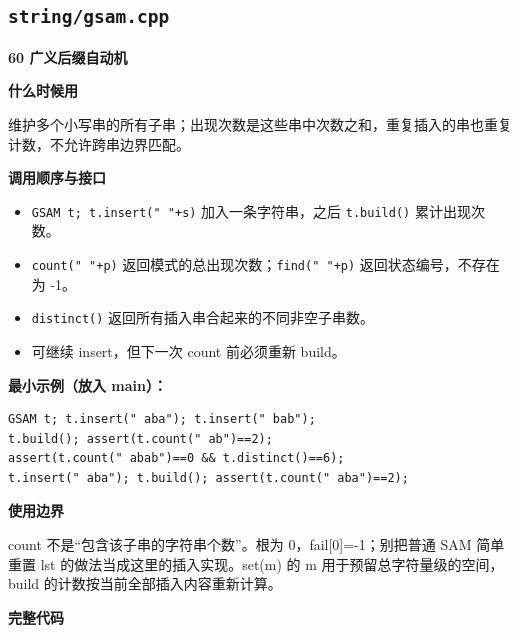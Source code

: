 \documentclass[UTF8,a4paper,10pt]{ctexart}
\newcommand{\TemplUsage}[1]{\textbf{什么时候用}\par #1\par}
\newcommand{\TemplApi}[1]{\textbf{调用顺序与接口}\par #1\par}
\newcommand{\TemplNote}[1]{\textbf{使用边界}\par #1\par}
\begin{document}
\subsection{\texttt{string/gsam.cpp}}
\textbf{60 广义后缀自动机}

\TemplUsage{维护多个小写串的所有子串；出现次数是这些串中次数之和，重复插入的串也重复计数，不允许跨串边界匹配。}
\TemplApi{\begin{itemize}
\item \texttt{GSAM t; t.insert(" "+s)} 加入一条字符串，之后 \texttt{t.build()} 累计出现次数。
\item \texttt{count(" "+p)} 返回模式的总出现次数；\texttt{find(" "+p)} 返回状态编号，不存在为 -1。
\item \texttt{distinct()} 返回所有插入串合起来的不同非空子串数。
\item 可继续 insert，但下一次 count 前必须重新 build。
\end{itemize}}
\textbf{最小示例（放入 main）：}
\begin{lstlisting}
GSAM t; t.insert(" aba"); t.insert(" bab");
t.build(); assert(t.count(" ab")==2);
assert(t.count(" abab")==0 && t.distinct()==6);
t.insert(" aba"); t.build(); assert(t.count(" aba")==2);
\end{lstlisting}
\TemplNote{count 不是“包含该子串的字符串个数”。根为 0，fail[0]=-1；别把普通 SAM 简单重置 lst 的做法当成这里的插入实现。set(m) 的 m 用于预留总字符量级的空间，build 的计数按当前全部插入内容重新计算。}
\textbf{完整代码}
\end{document}
